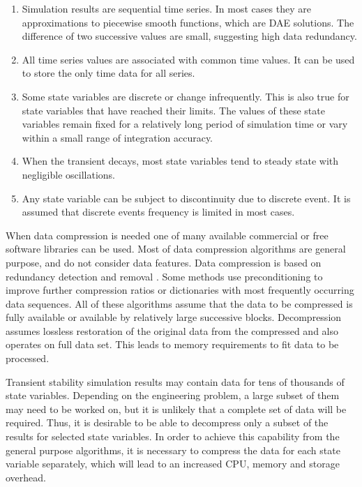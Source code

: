 \documentclass[lettersize,journal]{IEEEtran}
\begin{document}
\begin{enumerate}
	\item{Simulation results are sequential time series. In most cases they are approximations
	to piecewise smooth functions, which are DAE solutions. The difference of two successive
	values are small, suggesting high data redundancy.}
	\item{All time series values are associated with common time values. It can be used to store the only time data for all series.}
	\item{Some state variables are discrete or change infrequently. This is also true for state variables that have reached their limits. The values of these state variables remain fixed for a relatively long period of simulation time or vary within a small range of integration accuracy.}
	\item{When the transient decays, most state variables tend to steady state with negligible oscillations.}
	\item{Any state variable can be subject to discontinuity due to discrete event. It is assumed that discrete events frequency is limited in most cases. }
\end{enumerate}

When data compression is needed one of many available commercial or free software libraries can be used.
Most of data compression algorithms are general purpose, and do not consider data features.
Data compression is based on redundancy detection and removal \cite{lzw77,welch84}. 
Some methods use preconditioning to improve further compression ratios \cite{bwt94} or dictionaries 
with most frequently occurring data sequences.  All of these algorithms assume that the data to be compressed is
fully available or available by relatively large successive blocks. Decompression assumes 
lossless restoration of the original data from the compressed and also operates on full data set. 
This leads to memory requirements to fit data to be processed.

Transient stability simulation results may contain data for tens of thousands of state variables.
Depending on the engineering problem, a large subset of them may need to be worked on, but it is unlikely that a complete set of data will be required.
Thus, it is desirable to be able to decompress only a subset of the results for selected state variables. 
In order to achieve this capability from the general purpose algorithms, it is necessary to compress the data for each 
state variable separately, which will lead to an increased CPU, memory and storage overhead.
\end{document}
